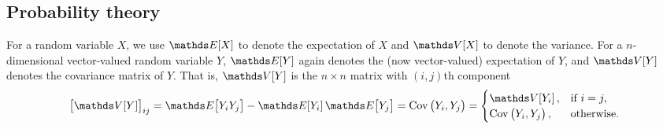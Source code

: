 \subsection{Probability theory}
For a random variable \(X\), we use \(\avg{X}\) to denote the expectation of \(X\) and \(\var{X}\) to denote the variance.
For a \(n\)-dimensional vector-valued random variable \(Y\), \(\avg{Y}\) again denotes the (now vector-valued) expectation of \(Y\), and \(\var{Y}\) denotes the covariance matrix of \(Y\).
That is, \(\var{Y}\) is the \(n\times n\) matrix with \((i,j)\)th component
\[
	\left[\var{Y}\right]_{ij} = \avg{Y_iY_j} - \avg{Y_i}\avg{Y_j} = \mathrm{Cov}\left(Y_i, Y_j\right) = \begin{cases}
		\var{Y_i},                         & \text{if } i = j, \\
		\mathrm{Cov}\left(Y_i, Y_j\right), & \text{otherwise}.
	\end{cases}
\]

